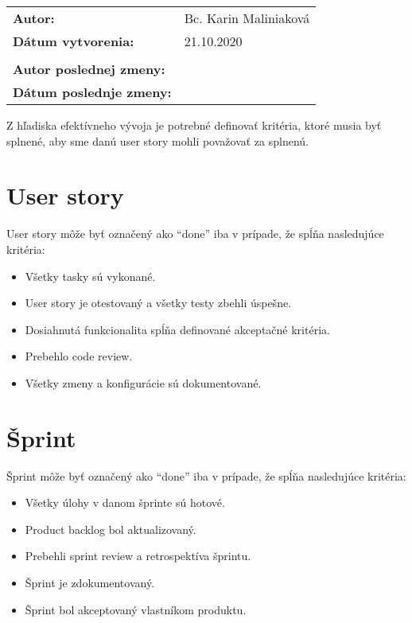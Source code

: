\documentclass{article}
\begin{document}
    

    \begin{table}[h]
        \begin{tabular}{ll}
            \textbf{Autor:} & Bc. Karin Maliniaková \\
            \textbf{Dátum vytvorenia:} & 21.10.2020 \\
            \\
            \textbf{Autor poslednej zmeny:} &  \\
            \textbf{Dátum poslednje zmeny:} &  \\
            \hline
        \end{tabular}
        \label{tab:grades}
    \end{table}

    \noindent \textnormal{Z hľadiska efektívneho vývoja je potrebné definovať kritéria, ktoré musia byť splnené, aby sme danú user story mohli považovať za splnenú.}

    \section*{User story}

    \textnormal{User story môže byť označený ako “done” iba v prípade, že spĺňa nasledujúce kritéria:}

    \begin{itemize}
        \item Všetky tasky sú vykonané.
        \item User story je otestovaný a všetky testy zbehli úspešne.
        \item Dosiahnutá funkcionalita spĺňa definované akceptačné kritéria.
        \item Prebehlo code review.
        \item Všetky zmeny a konfigurácie sú dokumentované.
    \end{itemize}

    \section*{Šprint}

    \textnormal{Šprint môže byť označený ako “done” iba v prípade, že spĺňa nasledujúce kritéria:}

    \begin{itemize}
        \item Všetky úlohy v danom šprinte sú hotové.
        \item Product backlog bol aktualizovaný.
        \item Prebehli sprint review a retrospektíva šprintu.
        \item Šprint je zdokumentovaný.
        \item Šprint bol akceptovaný vlastníkom produktu.
    \end{itemize}
\end{document}
